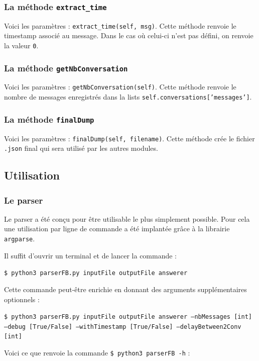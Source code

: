 \documentclass[10pt,a4paper]{article}
\begin{document}
\subsubsection{La méthode \texttt{extract\_time}}
Voici les paramètres : \texttt{extract\_time(self, msg)}. Cette méthode renvoie le timestamp associé au message. Dans le cas où celui-ci n'est pas défini, on renvoie la valeur \texttt{0}.

\subsubsection{La méthode \texttt{getNbConversation}}
Voici les paramètres : \texttt{getNbConversation(self)}. Cette méthode renvoie le nombre de messages enregistrés dans la lists \texttt{self.conversations['messages']}.

\subsubsection{La méthode \texttt{finalDump}}
Voici les paramètres : \texttt{finalDump(self, filename)}. Cette méthode crée le fichier \texttt{.json} final qui sera utilisé par les autres modules.

\subsection{Utilisation}
\subsubsection{Le parser}
Le parser a été conçu pour être utilisable le plus simplement possible. Pour cela une utilisation par ligne de commande a été implantée grâce à la librairie \texttt{argparse}.

Il suffit d'ouvrir un terminal et de lancer la commande :

\begin{center}
	\texttt{\$ python3 parserFB.py inputFile outputFile answerer}
\end{center}

Cette commande peut-être enrichie en donnant des arguments supplémentaires optionnels :

\begin{center}
	\texttt{\$ python3 parserFB.py inputFile outputFile answerer --nbMessages [int] --debug [True/False] --withTimestamp [True/False] --delayBetween2Conv [int]}
\end{center}

Voici ce que renvoie la commande \texttt{\$ python3 parserFB -h} :
\end{document}
